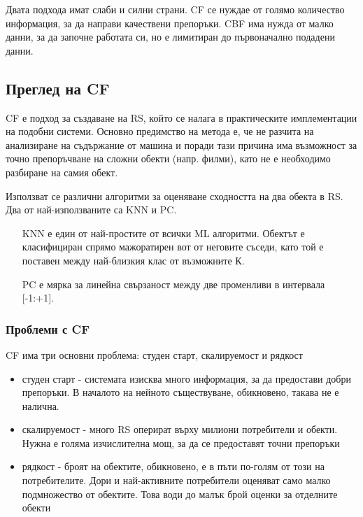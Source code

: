 	Двата подхода имат слаби и силни страни. \ac{CF} се нуждае от голямо количество информация, за да направи качествени препоръки. \ac{CBF} има нужда от малко данни, за да започне работата си, но е лимитиран до първоначално подадени данни.
	
	\subsection{Преглед на \ac{CF}}
	
		\ac{CF} е подход за създаване на \ac{RS}, който се налага в практическите имплементации на подобни системи. Основно предимство
		на метода е, че не разчита на анализиране на съдържание от машина и поради тази причина има възможност за точно препоръчване на
		сложни обекти (напр. филми), като не е необходимо разбиране на самия обект.
		
		Използват се различни алгоритми за оценяване сходността на два обекта в \ac{RS}. Два от най-използваните са \ac{KNN} и \ac{PC}.
		
		\begin{itemize}
			\item[\ac{KNN}] е един от най-простите от всички \ac{ML} алгоритми. Обектът е класифициран спрямо мажоратирен вот от неговите съседи, като той е поставен между най-близкия клас от възможните К.
			\item[\ac{PC}] е мярка за линейна свързаност между две променливи в интервала [-1:+1].
		\end{itemize}
		
	\subsubsection{Проблеми с \ac{CF}}
		
		\ac{CF} има три основни проблема: студен старт, скалируемост и рядкост
		
		\begin{itemize}
			\item студен старт - системата изисква много информация, за да предостави добри препоръки. В началото на нейното съществуване, обикновено, такава не е налична.
			\item скалируемост - много \ac{RS} оперират върху милиони потребители и обекти. Нужна е голяма изчислителна мощ, за да се предоставят точни препоръки
			\item рядкост - броят на обектите, обикновено, е в пъти по-голям от този на потребителите. Дори и най-активните потребители оценяват само малко подмножество от обектите. Това води до малък брой оценки за отделните обекти
		\end{itemize}
		
